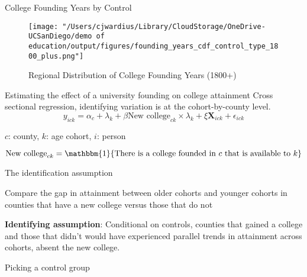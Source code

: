 \documentclass[notes,11pt, aspectratio=169]{beamer}
\newenvironment{wideitemize}{\itemize\addtolength{\itemsep}{10pt}}{\enditemize}
\begin{document}
\begin{frame}{College Founding Years by Control}
    \begin{figure}
        \centering
        \texttt{[image: "/Users/cjwardius/Library/CloudStorage/OneDrive-UCSanDiego/demo of education/output/figures/founding\_years\_cdf\_control\_type\_1800\_plus.png"]}
        \caption{Regional Distribution of College Founding Years (1800+)}
    \end{figure}
\end{frame}


\begin{frame}{Estimating the effect of a university founding on college attainment}
  Cross sectional regression, identifying variation is at the cohort-by-county level.
  \begin{equation}
    y_{ick} = \alpha_c + \lambda_k + \beta \text{New college}_{ck}\times \lambda_k +\xi \bm{X}_{ick} + \epsilon_{ick}
  \end{equation}
  \begin{wideitemize}
    \item $c$: county, $k$: age cohort, $i$: person
    \item $\text{New college}_{ck} = \mathbbm{1}\{\text{There is a college founded in $c$ that is available to $k$}\}$
  \end{wideitemize}
\end{frame}

\begin{frame}{The identification assumption}
\begin{wideitemize}
  \item Compare the gap in attainment between older cohorts and younger cohorts in counties that have a new college versus those that do not
  \item \textbf{Identifying assumption}: Conditional on controls, counties that gained a college and those that didn't would have experienced parallel trends in attainment across cohorts, absent the new college.
\end{wideitemize}
\end{frame}

\begin{frame}{Picking a control group}

\end{frame}
\end{document}
